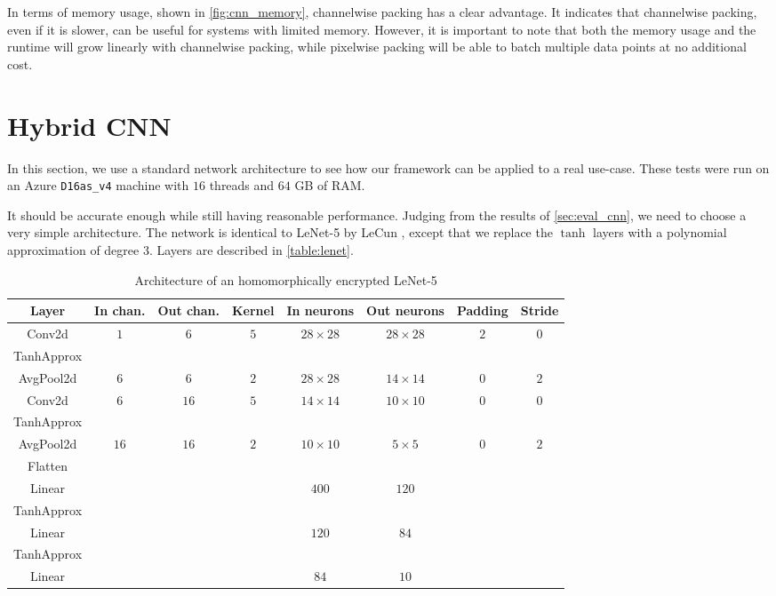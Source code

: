 \documentclass[a4paper,11pt,oneside]{report}
\begin{document}
In terms of memory usage, shown in \autoref{fig:cnn_memory}, channelwise packing has a clear advantage.
It indicates that channelwise packing, even if it is slower, can be useful for systems with limited memory.
However, it is important to note that both the memory usage and the runtime will grow linearly with channelwise packing, while pixelwise packing will be able to batch multiple data points at no additional cost.


\section{Hybrid CNN}

In this section, we use a standard network architecture to see how our framework can be applied to a real use-case. 
These tests were run on an Azure \texttt{D16as\_v4} machine with $16$ threads and $64$ GB of RAM.

It should be accurate enough while still having reasonable performance.
Judging from the results of \autoref{sec:eval_cnn}, we need to choose a very simple architecture. 
The network is identical to LeNet-5 by LeCun \cite{lecun_gradient-based_1998}, except that we replace the $\tanh$ layers with a polynomial approximation of degree $3$. 
Layers are described in \autoref{table:lenet}.

\begin{table}[h!]
  \begin{center}
    \caption{Architecture of an homomorphically encrypted LeNet-5}
    \label{table:lenet}
    \begin{tabular}{ c c c c c c c c }
    \hline
    Layer & In chan. & Out chan. & Kernel & In neurons & Out neurons & Padding & Stride \\
    \hline
    Conv2d & $1$ & $6$ & $5$ & $28 \times 28$ & $28 \times 28$ & $2$ & $0$ \\
    TanhApprox & & & & & & &  \\
    AvgPool2d & $6$ & $6$ & $2$ & $28 \times 28$ & $14 \times 14$ & $0$ & $2$ \\
    Conv2d & $6$ & $16$ & $5$ & $14 \times 14$ & $10 \times 10$ & $0$ & $0$ \\
    TanhApprox & & & & & & &  \\
    AvgPool2d & $16$ & $16$ & $2$ & $10 \times 10$ & $5 \times 5$ & $0$ & $2$ \\
    Flatten \\
    Linear & & & & $400$ & $120$ & &  \\
    TanhApprox & & & & & & &  \\
    Linear & & & & $120$ & $84$ & &  \\
    TanhApprox & & & & & & &  \\
    Linear & & & & $84$ & $10$ & &  \\
    \hline
    \end{tabular}
  \end{center}
\end{table}
\end{document}
